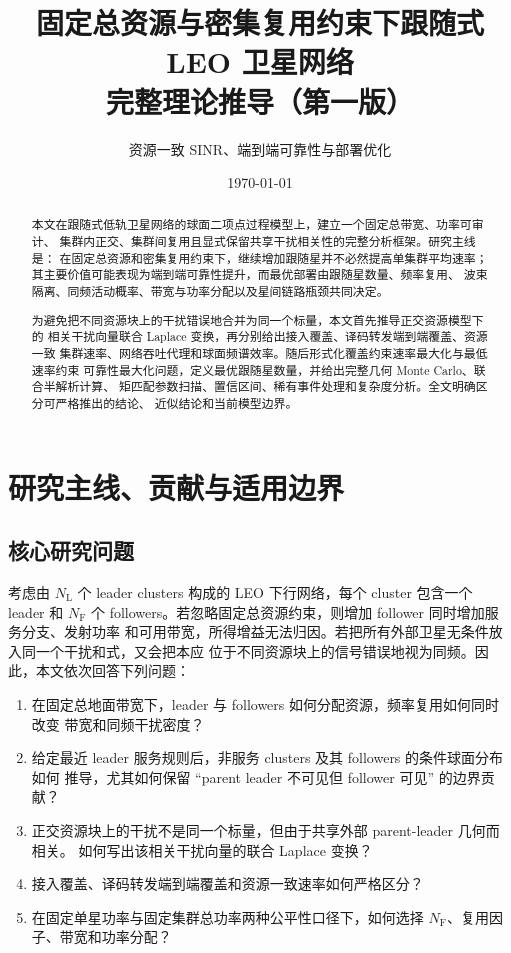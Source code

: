\documentclass[UTF8,a4paper,11pt]{ctexart}
\title{固定总资源与密集复用约束下跟随式 LEO 卫星网络\\
完整理论推导（第一版）}
\author{资源一致 SINR、端到端可靠性与部署优化}
\date{\today}
\newcommand{\NL}{N_{\mathrm L}}
\newcommand{\NF}{N_{\mathrm F}}
\begin{document}
\maketitle
\tableofcontents
\newpage

\begin{abstract}
本文在跟随式低轨卫星网络的球面二项点过程模型上，建立一个固定总带宽、功率可审计、
集群内正交、集群间复用且显式保留共享干扰相关性的完整分析框架。研究主线是：
在固定总资源和密集复用约束下，继续增加跟随星并不必然提高单集群平均速率；
其主要价值可能表现为端到端可靠性提升，而最优部署由跟随星数量、频率复用、
波束隔离、同频活动概率、带宽与功率分配以及星间链路瓶颈共同决定。

为避免把不同资源块上的干扰错误地合并为同一个标量，本文首先推导正交资源模型下的
相关干扰向量联合 Laplace 变换，再分别给出接入覆盖、译码转发端到端覆盖、资源一致
集群速率、网络吞吐代理和球面频谱效率。随后形式化覆盖约束速率最大化与最低速率约束
可靠性最大化问题，定义最优跟随星数量，并给出完整几何 Monte Carlo、联合半解析计算、
矩匹配参数扫描、置信区间、稀有事件处理和复杂度分析。全文明确区分可严格推出的结论、
近似结论和当前模型边界。
\end{abstract}

\section{研究主线、贡献与适用边界}

\subsection{核心研究问题}

考虑由 $\NL$ 个 leader clusters 构成的 LEO 下行网络，每个 cluster 包含一个 leader 和
$\NF$ 个 followers。若忽略固定总资源约束，则增加 follower 同时增加服务分支、发射功率
和可用带宽，所得增益无法归因。若把所有外部卫星无条件放入同一个干扰和式，又会把本应
位于不同资源块上的信号错误地视为同频。因此，本文依次回答下列问题：
\begin{enumerate}[leftmargin=2em]
  \item 在固定总地面带宽下，leader 与 followers 如何分配资源，频率复用如何同时改变
  带宽和同频干扰密度？
  \item 给定最近 leader 服务规则后，非服务 clusters 及其 followers 的条件球面分布如何
  推导，尤其如何保留 ``parent leader 不可见但 follower 可见'' 的边界贡献？
  \item 正交资源块上的干扰不是同一个标量，但由于共享外部 parent-leader 几何而相关。
  如何写出该相关干扰向量的联合 Laplace 变换？
  \item 接入覆盖、译码转发端到端覆盖和资源一致速率如何严格区分？
  \item 在固定单星功率与固定集群总功率两种公平性口径下，如何选择
  $\NF$、复用因子、带宽和功率分配？
\end{enumerate}
\end{document}
